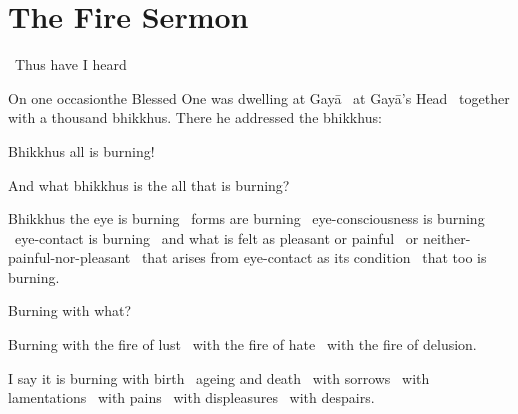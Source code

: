 \section{The Fire Sermon}
\label{fire-sermon}

\begin{leader-english}
  \anglebracketleft\ \hspace{-0.5mm}Thus have I heard \hspace{-0.5mm}\anglebracketright\
\end{leader-english}

\begin{english-only-hang}
  On one occasion\makeatletter\hyperlink{endnote113-appendix}\makeatother the Blessed One was dwelling at Gayā \breathmark\ at Gayā's Head \breathmark\ together with a thousand bhikkhus. There he addressed the bhikkhus:
\end{english-only-hang}

\begin{english-only-hang}
  Bhikkhus all is burning!
\end{english-only-hang}

\begin{english-only-hang}
  And what bhikkhus is the all that is burning?
\end{english-only-hang}

\begin{english-only-hang}
  Bhikkhus the eye is burning \breathmark\ forms are burning \breathmark\ eye-consciousness is burning \breathmark\ eye-contact is burning \breathmark\ and what is felt as pleasant or painful \breathmark\ or neither-painful-nor-pleasant \breathmark\ that arises from eye-contact as its condition \breathmark\ that too is burning.
\end{english-only-hang}
\begin{english-only-hangtogether}
  Burning with what?
\end{english-only-hangtogether}
\begin{english-only-hangtogether}
  Burning with the fire of lust \breathmark\ with the fire of hate \breathmark\ with the fire of delusion.
\end{english-only-hangtogether}
\begin{english-only-hangtogether}
  I say it is burning with birth \breathmark\ ageing and death \breathmark\ with sorrows \breathmark\ with lamentations \breathmark\ with pains \breathmark\ with displeasures \breathmark\ with despairs.
\end{english-only-hangtogether}

